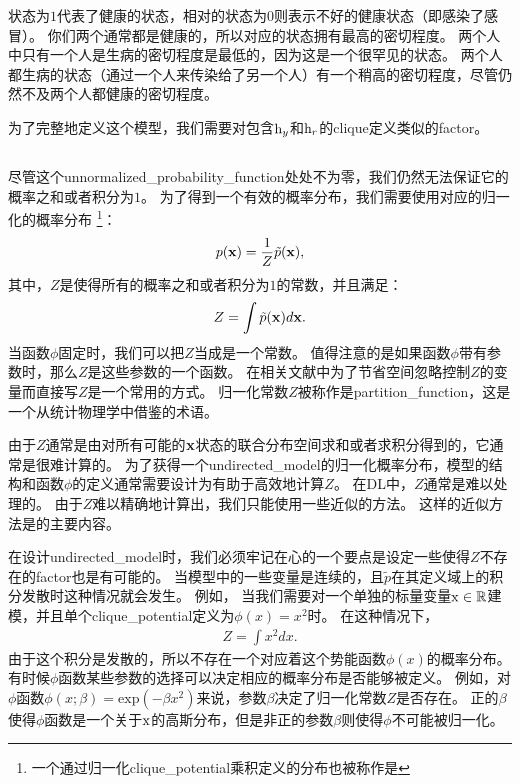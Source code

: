 状态为$1$代表了健康的状态，相对的状态为$0$则表示不好的健康状态（即感染了感冒）。
你们两个通常都是健康的，所以对应的状态拥有最高的密切程度。
两个人中只有一个人是生病的密切程度是最低的，因为这是一个很罕见的状态。
两个人都生病的状态（通过一个人来传染给了另一个人）有一个稍高的密切程度，尽管仍然不及两个人都健康的密切程度。


为了完整地定义这个模型，我们需要对包含$\mathrm{h}_y$和$\mathrm{h}_r$的\gls{clique}定义类似的\gls{factor}。


\subsection{}
\label{sec:the_partition_function}



尽管这个\gls{unnormalized_probability_function}处处不为零，我们仍然无法保证它的概率之和或者积分为$1$。
为了得到一个有效的概率分布，我们需要使用对应的归一化的概率分布
\footnote{一个通过归一化\gls{clique_potential}乘积定义的分布也被称作是}：
\begin{align}
p(\mathbf{x}) = \frac{1}{Z}\tilde{p}(\mathbf{x}),
\end{align}
其中，$Z$是使得所有的概率之和或者积分为$1$的常数，并且满足：
\begin{align}
Z = \int \tilde{p}(\mathbf{x})d\mathbf{x}.
\end{align}
当函数$\phi$固定时，我们可以把$Z$当成是一个常数。
值得注意的是如果函数$\phi$带有参数时，那么$Z$是这些参数的一个函数。
在相关文献中为了节省空间忽略控制$Z$的变量而直接写$Z$是一个常用的方式。
归一化常数$Z$被称作是\gls{partition_function}，这是一个从统计物理学中借鉴的术语。


由于$Z$通常是由对所有可能的$\mathbf{x}$状态的联合分布空间求和或者求积分得到的，它通常是很难计算的。
为了获得一个\gls{undirected_model}的归一化概率分布，模型的结构和函数$\phi$的定义通常需要设计为有助于高效地计算$Z$。
在\gls{DL}中，$Z$通常是难以处理的。
由于$Z$难以精确地计算出，我们只能使用一些近似的方法。
这样的近似方法是的主要内容。


在设计\gls{undirected_model}时，我们必须牢记在心的一个要点是设定一些使得$Z$不存在的\gls{factor}也是有可能的。
当模型中的一些变量是连续的，且$\tilde{p}$在其定义域上的积分发散时这种情况就会发生。
例如， 当我们需要对一个单独的标量变量$\mathrm{x}\in\mathbb{R}$建模，并且单个\gls{clique_potential}定义为$\phi(x) = x^2$时。
在这种情况下，
\begin{align}
Z = \int x^2 dx.
\end{align}
由于这个积分是发散的，所以不存在一个对应着这个势能函数$\phi(x)$的概率分布。
有时候$\phi$函数某些参数的选择可以决定相应的概率分布是否能够被定义。
例如，对$\phi$函数$\phi(x;\beta) = \text{exp}(-\beta x^2)$来说，参数$\beta$决定了归一化常数$Z$是否存在。
正的$\beta$使得$\phi$函数是一个关于$\mathrm{x}$的高斯分布，但是非正的参数$\beta$则使得$\phi$不可能被归一化。


